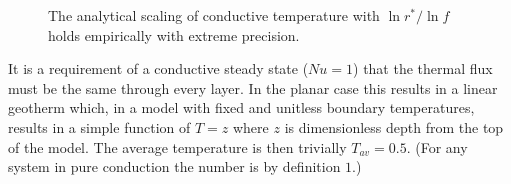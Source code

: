\documentclass[letterpaper,10pt,english]{jupyterBook}
\begin{document}
\begin{figure}[htbp]
\centering
\capstart

\noindent{}
\caption{The analytical scaling of conductive temperature with \(\ln{r^{*}}/\ln{f}\) holds empirically with extreme precision.}\label{\detokenize{content/chapter_04_isoviscous/background/cylindrical:isocondffit}}\end{figure}

\sphinxAtStartPar
It is a requirement of a conductive steady state (\(Nu=1\)) that the thermal flux must be the same through every layer. In the planar case this results in a linear geotherm which, in a model with fixed and unitless boundary temperatures, results in a simple function of \(T = z\) where \(z\) is dimensionless depth from the top of the model. The average temperature is then trivially \(T_{av}=0.5\). (For any system in pure conduction the  number is by definition \(1\).)
\end{document}
